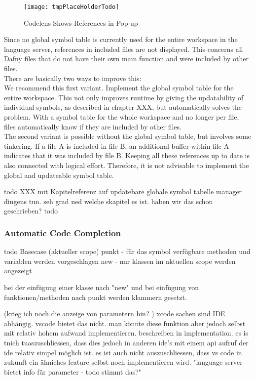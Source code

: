 \begin{figure}[H]
    \centering
    \texttt{[image: tmpPlaceHolderTodo]}
    \caption{Codelens Shows References in Pop-up}
    \label{fig:result_codelens_references_popup}
\end{figure}

Since no global symbol table is currently used for the entire workspace in the language server,
references in included files are not displayed.
This concerns all Dafny files that do not have their own main function and were included by other files. \\

There are basically two ways to improve this: \\

We recommend this first variant.
Implement the global symbol table for the entire workspace.
This not only improves runtime by giving the updatability of individual symbols,
as described in chapter XXX, but automatically solves the problem.
With a symbol table for the whole workspace and no longer per file,
files automatically know if they are included by other files. \\

The second variant is possible without the global symbol table, but involves some tinkering.
If a file A is included in file B, an additional buffer within file A indicates that it was included by file B.
Keeping all these references up to date is also connected with logical effort.
Therefore, it is not advisable to implement the global and updateable symbol table.

todo XXX mit Kapitelreferenz auf updatebare globale symbol tabelle manager dingens tun.
seh grad ned welche skapitel es ist. haben wir das schon geschrieben? todo 

\subsubsection{Automatic Code Completion}
todo
Basecase (aktueller scope)
punkt - für das symbol verfügbare methoden und variablen werden vorgeschlagen
new - nur klassen im aktuellen scope werden angezeigt

bei der einfügung einer klasse nach "new" und bei einfügung von funktionen/methoden nach punkt werden klammern gesetzt.

(krieg ich noch die anzeige von parametern hin? )
xcode sachen sind IDE abhängig. vscode bietet das nicht. man könnte diese funktion aber jedoch selbst
mit relativ hohem aufwand implementieren. beschreiben in implementation.
es is tnich tuaszuschliessen, dass dies jedoch in anderen ide's mit einem api aufruf der ide relativ simpel möglich ist.
es ist auch nicht auszuschliessen, dass vs code in zukunft ein ähniches feature selbst noch implementieren wird.
"language server bietet info für parameter - todo stimmt das?"

